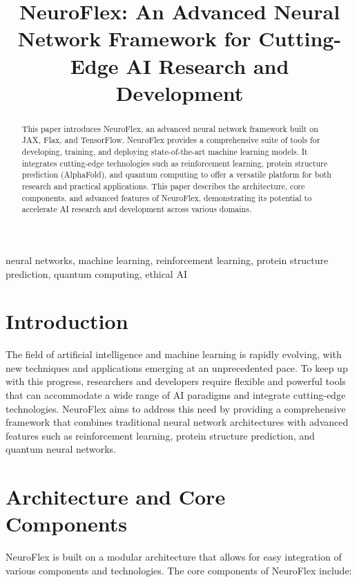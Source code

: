 \documentclass[conference]{IEEEtran}
\begin{document}
\title{NeuroFlex: An Advanced Neural Network Framework for Cutting-Edge AI Research and Development}

\author{
}

\maketitle

\begin{abstract}
This paper introduces NeuroFlex, an advanced neural network framework built on JAX, Flax, and TensorFlow. NeuroFlex provides a comprehensive suite of tools for developing, training, and deploying state-of-the-art machine learning models. It integrates cutting-edge technologies such as reinforcement learning, protein structure prediction (AlphaFold), and quantum computing to offer a versatile platform for both research and practical applications. This paper describes the architecture, core components, and advanced features of NeuroFlex, demonstrating its potential to accelerate AI research and development across various domains.
\end{abstract}

\begin{IEEEkeywords}
neural networks, machine learning, reinforcement learning, protein structure prediction, quantum computing, ethical AI
\end{IEEEkeywords}

\section{Introduction}
The field of artificial intelligence and machine learning is rapidly evolving, with new techniques and applications emerging at an unprecedented pace. To keep up with this progress, researchers and developers require flexible and powerful tools that can accommodate a wide range of AI paradigms and integrate cutting-edge technologies. NeuroFlex aims to address this need by providing a comprehensive framework that combines traditional neural network architectures with advanced features such as reinforcement learning, protein structure prediction, and quantum neural networks.

\section{Architecture and Core Components}
NeuroFlex is built on a modular architecture that allows for easy integration of various components and technologies. The core components of NeuroFlex include:
\end{document}
